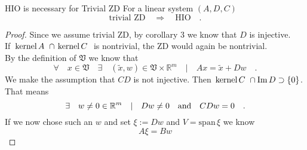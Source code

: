 \begin{proposition}{HIO is necessary for Trivial ZD}{}
	For a linear system $(A,D,C)$ 
	\begin{equation}
	\text{trivial ZD} \quad \Rightarrow \quad \text{HIO} \quad .
	\end{equation}
\end{proposition}
\begin{proof}
	Since we assume trivial ZD, by corollary 3 we know that $D$ is injective.\\
	If $ \, \text{kernel}\,A \,\,\cap  \, \text{kernel}\,C \,\,$ is nontrivial, the ZD would again be nontrivial.\\
	By the definition of $\mathfrak{V}$ we know that
	\begin{equation}
	\forall \quad x \in \mathfrak{V} \quad \exists \quad  (\tilde{x}, w)\in\mathfrak{V}
	\times \mathbb{R}^m \quad | \quad  Ax = \tilde{x} + D w \quad .
	\end{equation}
	We make the assumption that $CD$ is not injective. Then $ \, \text{kernel}\,C \,\,\cap \text{Im}\, D
	\supset \{0\}$. That means
	\begin{equation}
	\exists \quad w \neq 0 \in\mathbb{R}^m \quad | \quad Dw \neq 0 \quad \text{and} \quad CDw = 0
	 \quad .
	\end{equation}
	If we now chose such an $w$ and set $\xi := Dw$ and $V=\text{span}\,\xi$ we know 
	\begin{equation}
	A \xi = B w
	\end{equation}
\end{proof}